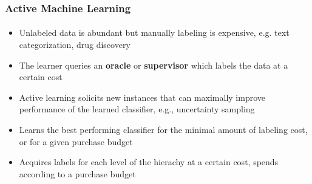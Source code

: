 \documentclass{beamer}
\begin{document}
\begin{frame}
    \frametitle{Active Machine Learning}     %
    \framesubtitle{}
\begin{itemize}
  \item Unlabeled data is abundant but manually labeling is expensive, e.g. text categorization, drug discovery
  \item The learner queries an \textbf{oracle} or \textbf{supervisor} which labels the data at a certain cost
  \item Active learning solicits new instances that can maximally improve performance of the learned classifier, e.g., uncertainty sampling
  \item Learns the best performing classifier for the minimal amount of labeling cost,
  or for a given purchase budget
  \item Acquires labels for each level of the hierachy at a certain cost, spends according to a purchase budget
\end{itemize}
\end{frame}
\end{document}
